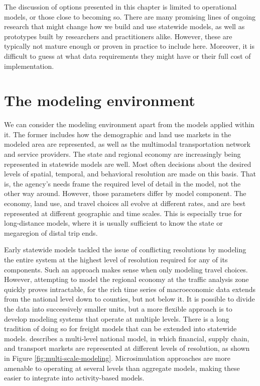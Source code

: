 The discussion of options presented in this chapter is limited to operational models, or those close to becoming so. There are many promising lines of ongoing research that might change how we build and use statewide models, as well as prototypes built by researchers and practitioners alike. However, these are typically not mature enough or proven in practice to include here. Moreover, it is difficult to guess at what data requirements they might have or their full cost of implementation.

\section{The modeling environment}

We can consider the modeling environment apart from the models applied within it. The former includes how the demographic and land use markets in the modeled area are represented, as well as the multimodal transportation network and service providers. The state and regional economy are increasingly being represented in statewide models are well. Most often decisions about the desired levels of spatial, temporal, and behavioral resolution are made on this basis. That is, the agency's needs frame the required level of detail in the model, not the other way around. However, those parameters differ by model component. The economy, land use, and travel choices all evolve at different rates, and are best represented at different geographic and time scales. This is especially true for long-distance models, where it is usually sufficient to know the state or megaregion of distal trip ends.

Early statewide models tackled the issue of conflicting resolutions by modeling the entire system at the highest level of resolution required for any of its components. Such an approach makes sense when only modeling travel choices. However, attempting to model the regional economy at the traffic analysis zone quickly proves intractable, for the rich time series of macroeconomic data extends from the national level down to counties, but not below it. It is possible to divide the data into successively smaller units, but a more flexible approach is to develop modeling systems that operate at multiple levels. There is a long tradition of doing so for freight models that can be extended into statewide models. \cite{xu03} describes a multi-level national model, in which financial, supply chain, and transport markets are represented at different levels of resolution, as shown in Figure \ref{fig:multi-scale-modeling}. Microsimulation approaches are more amenable to operating at several levels than aggregate models, making these easier to integrate into activity-based models.

